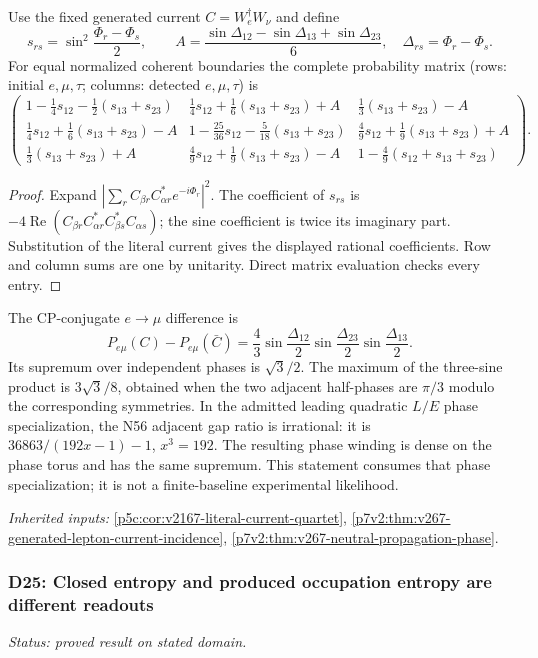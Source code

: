 \documentclass[12pt,a4paper]{article}
\begin{document}
Use the fixed generated current $C=W_e^\dagger W_\nu$ and define
\[
 s_{rs}=\sin^2\frac{\Phi_r-\Phi_s}{2},\qquad
 A=\frac{\sin\Delta_{12}-\sin\Delta_{13}+\sin\Delta_{23}}6,
 \quad \Delta_{rs}=\Phi_r-\Phi_s.
\]
For equal normalized coherent boundaries the complete probability matrix
(rows: initial $e,\mu,\tau$; columns: detected $e,\mu,\tau$) is
\[
\boxed{\begin{pmatrix}
1-\frac14s_{12}-\frac12(s_{13}+s_{23})&
\frac14s_{12}+\frac16(s_{13}+s_{23})+A&
\frac13(s_{13}+s_{23})-A\\[2pt]
\frac14s_{12}+\frac16(s_{13}+s_{23})-A&
1-\frac{25}{36}s_{12}-\frac5{18}(s_{13}+s_{23})&
\frac49s_{12}+\frac19(s_{13}+s_{23})+A\\[2pt]
\frac13(s_{13}+s_{23})+A&
\frac49s_{12}+\frac19(s_{13}+s_{23})-A&
1-\frac49(s_{12}+s_{13}+s_{23})
\end{pmatrix}.}
\]
\begin{proof}
Expand $|\sum_r C_{\beta r}C_{\alpha r}^*e^{-i\Phi_r}|^2$.
The coefficient of $s_{rs}$ is
$-4\operatorname{Re}(C_{\beta r}C_{\alpha r}^*C_{\beta s}^*C_{\alpha s})$;
the sine coefficient is twice its imaginary part. Substitution of the
literal current gives the displayed rational coefficients. Row and column
sums are one by unitarity. Direct matrix evaluation checks every entry.
\end{proof}

The CP-conjugate $e\to\mu$ difference is
\[
 \boxed{P_{e\mu}(C)-P_{e\mu}(\bar C)
 =\frac43\sin\frac{\Delta_{12}}2
             \sin\frac{\Delta_{23}}2
             \sin\frac{\Delta_{13}}2.}
\]
Its supremum over independent phases is $\sqrt3/2$. The maximum of the
three-sine product is $3\sqrt3/8$, obtained when the two adjacent
half-phases are $\pi/3$ modulo the corresponding symmetries. In the
admitted leading quadratic $L/E$ phase specialization, the N56 adjacent
gap ratio is irrational: it is $36863/(192x-1)-1$, $x^3=192$.
The resulting phase winding is dense on the phase torus and has the same
supremum. This statement consumes that phase specialization; it is not a
finite-baseline experimental likelihood.
\par\noindent\textit{Inherited inputs:} \ref{p5c:cor:v2167-literal-current-quartet}, \ref{p7v2:thm:v267-generated-lepton-current-incidence}, \ref{p7v2:thm:v267-neutral-propagation-phase}.

\subsubsection{D25: Closed entropy and produced occupation entropy are different readouts}
\label{p5c:sec:v2201-derived-d25}
\noindent\textit{Status: proved result on stated domain.}
\end{document}
